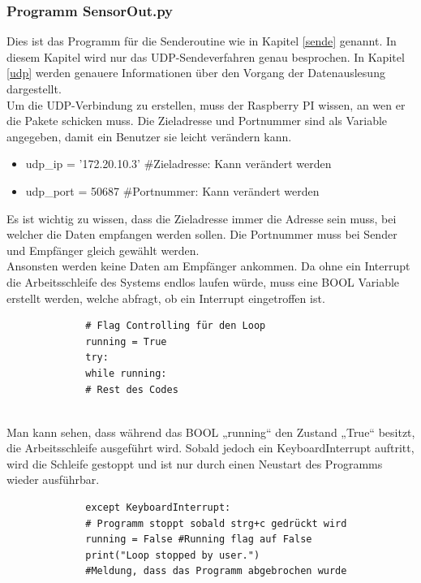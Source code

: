 \subsubsection{Programm SensorOut.py}\label{out}
Dies ist das Programm für die Senderoutine wie in Kapitel \ref{sende} genannt. In diesem Kapitel wird nur das UDP-Sendeverfahren genau besprochen. In Kapitel \ref{udp} werden genauere Informationen über den Vorgang der Datenauslesung dargestellt. \\
\vspace{3mm}
Um die UDP-Verbindung zu erstellen, muss der Raspberry PI wissen, an wen er die Pakete schicken muss. Die Zieladresse und Portnummer sind als Variable angegeben, damit ein Benutzer sie leicht verändern kann.
\begin{itemize}
	\item udp\_ip = '172.20.10.3' \#Zieladresse: Kann verändert werden 
	\item udp\_port = 50687 \#Portnummer: Kann verändert werden
\end{itemize}
Es ist wichtig zu wissen, dass die Zieladresse immer die Adresse sein muss, bei welcher die Daten empfangen werden sollen. Die Portnummer muss bei Sender und Empfänger gleich gewählt werden.\\
\vspace{3mm} Ansonsten werden keine Daten am Empfänger ankommen.
Da ohne ein Interrupt die Arbeitsschleife des Systems endlos laufen würde, muss eine BOOL Variable erstellt werden, welche abfragt, ob ein Interrupt eingetroffen ist. 
\vspace{3mm}
\begin{figure}[H]
	\centering
	\begin{verbatim}
		# Flag Controlling für den Loop
		running = True
		try:
		while running:
		# Rest des Codes 
		
	\end{verbatim}
\end{figure}
\vspace{3mm}
Man kann sehen, dass während das BOOL „running“ den Zustand „True“ besitzt, die Arbeitsschleife ausgeführt wird.  Sobald jedoch ein KeyboardInterrupt auftritt, wird die Schleife gestoppt und ist nur durch einen Neustart des Programms wieder ausführbar.
\vspace{3mm}
\begin{figure}[H]
	\centering
	\begin{verbatim}
		except KeyboardInterrupt:
		# Programm stoppt sobald strg+c gedrückt wird
		running = False #Running flag auf False
		print("Loop stopped by user.") 
		#Meldung, dass das Programm abgebrochen wurde
	\end{verbatim}
\end{figure}
